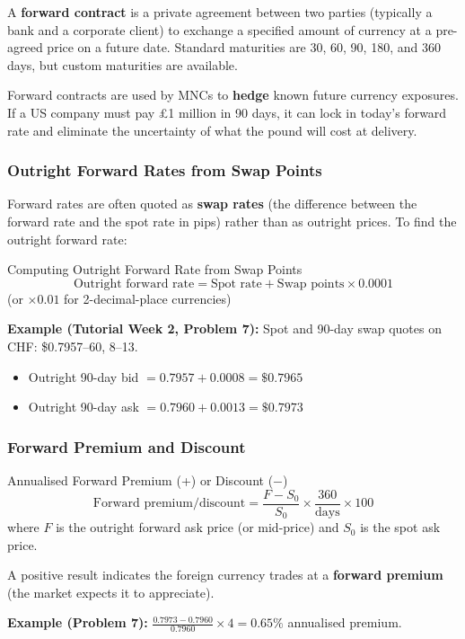 \documentclass[11pt,a4paper]{article}
\begin{document}
A \textbf{forward contract} is a private agreement between two parties (typically a bank and a corporate client) to exchange a specified amount of currency at a pre-agreed price on a future date. Standard maturities are 30, 60, 90, 180, and 360 days, but custom maturities are available.

Forward contracts are used by MNCs to \textbf{hedge} known future currency exposures. If a US company must pay £1 million in 90 days, it can lock in today's forward rate and eliminate the uncertainty of what the pound will cost at delivery.

\subsubsection{Outright Forward Rates from Swap Points}

Forward rates are often quoted as \textbf{swap rates} (the difference between the forward rate and the spot rate in pips) rather than as outright prices. To find the outright forward rate:

\begin{formulabox}{Computing Outright Forward Rate from Swap Points}
\[
  \text{Outright forward rate} = \text{Spot rate} + \text{Swap points} \times 0.0001
\]
(or $\times 0.01$ for 2-decimal-place currencies)

\textbf{Example (Tutorial Week 2, Problem 7):} Spot and 90-day swap quotes on CHF: \$0.7957--60, 8--13.
\begin{itemize}
  \item Outright 90-day bid $= 0.7957 + 0.0008 = \$0.7965$
  \item Outright 90-day ask $= 0.7960 + 0.0013 = \$0.7973$
\end{itemize}
\end{formulabox}

\subsubsection{Forward Premium and Discount}

\begin{formulabox}{Annualised Forward Premium (+) or Discount ($-$)}
\[
  \text{Forward premium/discount} = \frac{F - S_0}{S_0} \times \frac{360}{\text{days}} \times 100
\]
where $F$ is the outright forward ask price (or mid-price) and $S_0$ is the spot ask price.

A positive result indicates the foreign currency trades at a \textbf{forward premium} (the market expects it to appreciate).

\textbf{Example (Problem 7):} $\frac{0.7973 - 0.7960}{0.7960} \times 4 = 0.65\%$ annualised premium.
\end{formulabox}
\end{document}
